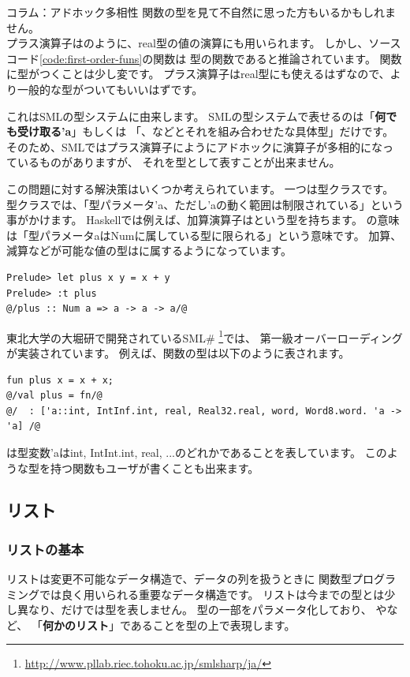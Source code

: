 \documentclass[11pt,a4paper]{jarticle}
\begin{document}
\begin{itembox}[l]{コラム：アドホック多相性}
関数の型を見て不自然に思った方もいるかもしれません。\\
プラス演算子はのように、real型の値の演算にも用いられます。
しかし、ソースコード\ref{code:first-order-funs}の関数は
型の関数であると推論されています。
関数に型がつくことは少し変です。
プラス演算子はreal型にも使えるはずなので、より一般的な型がついてもいいはずです。

これはSMLの型システムに由来します。
SMLの型システムで表せるのは「\textbf{何でも受け取る'a}」もしくは
「、などとそれを組み合わせたな具体型」だけです。
そのため、SMLではプラス演算子にようにアドホックに演算子が多相的になっているものがありますが、
それを型として表すことが出来ません。

この問題に対する解決策はいくつか考えられています。
一つは型クラスです。型クラスでは、「型パラメータ'a、ただし'aの動く範囲は制限されている」という事がかけます。
Haskellでは例えば、加算演算子はという型を持ちます。
の意味は「型パラメータaはNumに属している型に限られる」という意味です。
加算、減算などが可能な値の型はに属するようになっています。

\begin{lstlisting}[caption=Haskellでのplusの型付け]
Prelude> let plus x y = x + y
Prelude> :t plus
@/plus :: Num a => a -> a -> a/@
\end{lstlisting}

東北大学の大堀研で開発されているSML\#
\footnote{\url{http://www.pllab.riec.tohoku.ac.jp/smlsharp/ja/}}では、
第一級オーバーローディングが実装されています。
例えば、関数の型は以下のように表されます。
\begin{lstlisting}[caption=SML\#でのplusの型付け]
fun plus x = x + x;
@/val plus = fn/@
@/  : ['a::int, IntInf.int, real, Real32.real, word, Word8.word. 'a -> 'a] /@
\end{lstlisting}
は型変数'aはint, IntInt.int, real, ...のどれかであることを表しています。
このような型を持つ関数もユーザが書くことも出来ます。
\end{itembox}

\label{sec:list}
\subsection{リスト}
\subsubsection{リストの基本}
リストは変更不可能なデータ構造で、データの列を扱うときに
関数型プログラミングでは良く用いられる重要なデータ構造です。
リストは今までの型とは少し異なり、だけでは型を表しません。
型の一部をパラメータ化しており、
やなど、
「{\bfseries 何かのリスト}」であることを型の上で表現します。
\end{document}
